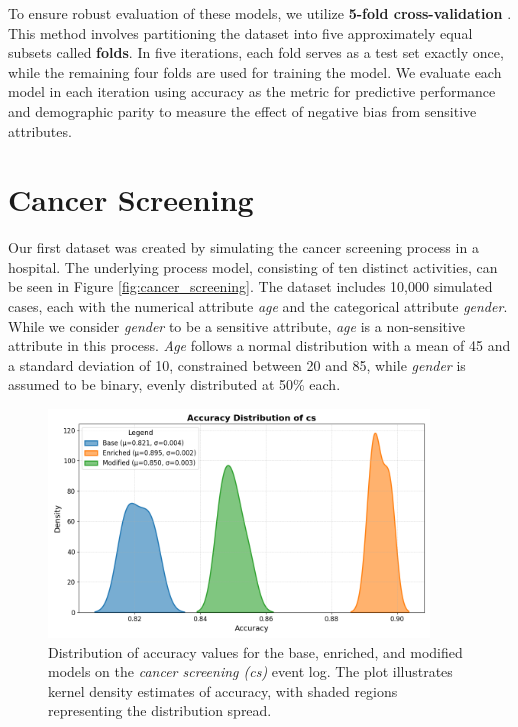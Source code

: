 To ensure robust evaluation of these models, we utilize \textbf{5-fold cross-validation} \cite{k_fold}.
This method involves partitioning the dataset into five approximately equal subsets called \textbf{folds}.
In five iterations, each fold serves as a test set exactly once, while the remaining four folds are used for training the model.
We evaluate each model in each iteration using accuracy as the metric for predictive performance
and demographic parity to measure the effect of negative bias from sensitive attributes.

\section{Cancer Screening}
\label{sec:cancer_screening}
Our first dataset was created by simulating the cancer screening process in a hospital.
The underlying process model, consisting of ten distinct activities, can be seen in Figure \ref{fig:cancer_screening}.
The dataset includes 10,000 simulated cases, each with the numerical attribute \textit{age}
and the categorical attribute \textit{gender}.
While we consider \textit{gender} to be a sensitive attribute,
\textit{age} is a non-sensitive attribute in this process.
\textit{Age} follows a normal distribution with a mean of 45 and a standard deviation of 10,
constrained between 20 and 85, while \textit{gender} is assumed to be binary, evenly distributed at 50\% each.  

\begin{figure}[h!]
    \centering
    \includegraphics[width=0.9\textwidth]{gfx/cs_accuracy.png}
    \caption{Distribution of accuracy values for the base, enriched, and modified models on the \textit{cancer screening (cs)} event log.
    The plot illustrates kernel density estimates of accuracy, with shaded regions representing the distribution spread.}
    \label{fig:cs_accuracy}
\end{figure}

